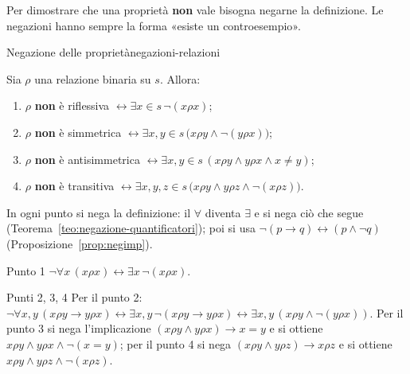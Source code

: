 Per dimostrare che una proprietà \textbf{non} vale bisogna negarne la definizione. Le negazioni hanno sempre la forma
«esiste un controesempio».

\begin{concetto}
\begin{Proposizione}{Negazione delle proprietà}{negazioni-relazioni}
    \begin{prerequisiti}
    \end{prerequisiti}
    Sia $\rho$ una relazione binaria su $s$. Allora:
    \begin{enumerate}
        \item $\rho$ \textbf{non} è riflessiva $\leftrightarrow \exists x \in s\,\neg(x \rho x)$;
        \item $\rho$ \textbf{non} è simmetrica $\leftrightarrow \exists x, y \in s\,\big(x \rho y \wedge \neg(y \rho x)\big)$;
        \item $\rho$ \textbf{non} è antisimmetrica $\leftrightarrow \exists x, y \in s\,(x \rho y \wedge y \rho x \wedge x \neq y)$;
        \item $\rho$ \textbf{non} è transitiva $\leftrightarrow \exists x, y, z \in s\,\big(x \rho y \wedge y \rho z \wedge \neg(x \rho z)\big)$.
    \end{enumerate}
\end{Proposizione}
\begin{dimostrazione}
    In ogni punto si nega la definizione: il $\forall$ diventa $\exists$ e si nega ciò che segue
    (Teorema~\ref{teo:negazione-quantificatori}); poi si usa $\neg(p \rightarrow q) \leftrightarrow (p \wedge \neg q)$
    (Proposizione~\ref{prop:negimp}).
    \begin{caso}{Punto 1}
        $\neg\forall x\,(x \rho x) \leftrightarrow \exists x\,\neg(x \rho x)$.
    \end{caso}
    \begin{caso}{Punti 2, 3, 4}
        Per il punto 2: $\neg\forall x, y\,(x \rho y \rightarrow y \rho x) \leftrightarrow \exists x, y\,\neg(x \rho y \rightarrow y \rho x)
        \leftrightarrow \exists x, y\,(x \rho y \wedge \neg(y \rho x))$. Per il punto 3 si nega l'implicazione
        $(x \rho y \wedge y \rho x) \rightarrow x = y$ e si ottiene $x \rho y \wedge y \rho x \wedge \neg(x = y)$; per il punto 4
        si nega $(x \rho y \wedge y \rho z) \rightarrow x \rho z$ e si ottiene $x \rho y \wedge y \rho z \wedge \neg(x \rho z)$.
    \end{caso}
\end{dimostrazione}
\end{concetto}

